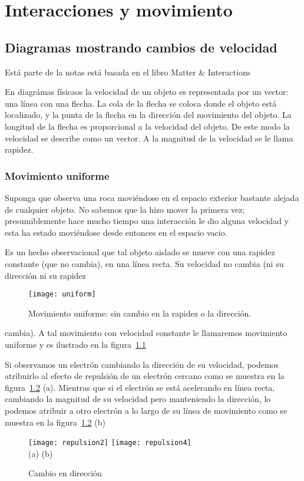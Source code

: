 
\chapter{Interacciones y movimiento}

 
\section{Diagramas mostrando cambios de velocidad}

Está parte de la notas está basada en el libro Matter \& Interactions \cite{MI}

En diagrámas físicaos la velocidad de un objeto es representada por un
vector: una línea con una flecha. La cola de la flecha se coloca donde
el objeto está localizado, y la punta de la flecha en la dirección del
movimiento del objeto. La longitud de la flecha es proporcional a la
velocidad del objeto. De este modo la velocidad se describe como un
vector. A la magnitud de la velocidad se le llama rapidez.

\subsection{Movimiento uniforme}
Suponga que observa una roca moviéndose en el espacio exterior
bastante alejada de cualquier objeto. No sabemos que la hizo mover la
primera vez; presumiblemente hace mucho tiempo una interacción le dio
alguna velocidad y esta ha estado moviéndose desde entonces en el
espacio vacio.

Es un hecho observacional que tal objeto aislado se mueve con una
rapidez constante (que no cambia), en una línea recta. Su velocidad no
cambia (ni su dirección ni su rapidez
\begin{figure}
  \centering
  \texttt{[image: uniform]}
  \caption{Movimiento uniforme: sin cambio en la rapidez o la dirección.}
  \label{fig:uniform}
\end{figure}
cambia). A tal movimiento con
velocidad constante le llamaremos movimiento uniforme y es ilustrado
en la figura~\ref{fig:uniform}

Si observamos un electrón cambiando la dirección de su velocidad, podemos atribuirlo al efecto de repulsión de un electrón cercano como se muestra en la figura~\ref{fig:repulsion2} (a). Mientras que si el electrón se está acelerando en línea recta, cambiando la magnitud de su velocidad pero manteniendo la dirección, lo podemos atribuir a otro electrón a lo largo de su línea de movimiento como se muestra en la figura~\ref{fig:repulsion2} (b)
\begin{figure}
  \centering
  \texttt{[image: repulsion2]} \texttt{[image: repulsion4]}\\
    (a) \hspace{5cm} (b)
  \caption{Cambio en dirección}
  \label{fig:repulsion2}
\end{figure}

